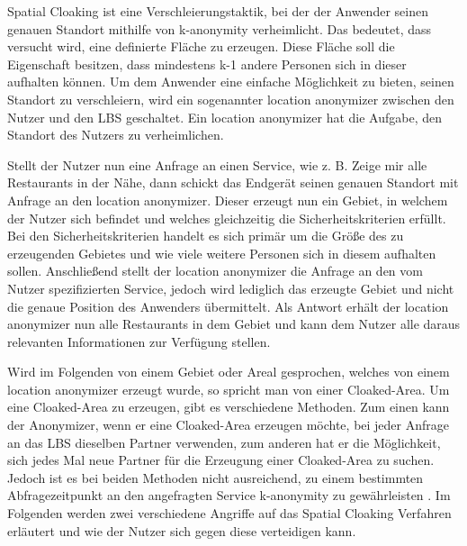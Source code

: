 Spatial Cloaking ist eine Verschleierungstaktik, bei der der Anwender seinen genauen Standort mithilfe von k-anonymity verheimlicht. Das bedeutet, dass versucht wird, eine definierte Fläche zu erzeugen. Diese Fläche soll die Eigenschaft besitzen, dass mindestens k-1 andere Personen sich in dieser aufhalten können. Um dem Anwender eine einfache Möglichkeit zu bieten, seinen Standort zu verschleiern, wird ein sogenannter location anonymizer zwischen den Nutzer und den LBS geschaltet. Ein location anonymizer hat die Aufgabe, den Standort des Nutzers zu verheimlichen.

Stellt der Nutzer nun eine Anfrage an einen Service, wie z. B. \glqq Zeige mir alle Restaurants in der Nähe\grqq, dann schickt das Endgerät seinen genauen Standort mit Anfrage an den location anonymizer. Dieser erzeugt nun ein Gebiet, in welchem der Nutzer sich befindet und welches gleichzeitig die Sicherheitskriterien erfüllt. Bei den Sicherheitskriterien handelt es sich primär um die Größe des zu erzeugenden Gebietes und wie viele weitere Personen sich in diesem aufhalten sollen. Anschließend stellt der location anonymizer die Anfrage an den vom Nutzer spezifizierten Service, jedoch wird lediglich das erzeugte Gebiet und nicht die genaue Position des Anwenders übermittelt. Als Antwort erhält der location anonymizer nun alle Restaurants in dem Gebiet und kann dem Nutzer alle daraus relevanten Informationen zur Verfügung stellen.

Wird im Folgenden von einem Gebiet oder Areal gesprochen, welches von einem location anonymizer erzeugt wurde, so spricht man von einer Cloaked-Area. Um eine Cloaked-Area zu erzeugen, gibt es verschiedene Methoden. Zum einen kann der Anonymizer, wenn er eine Cloaked-Area erzeugen möchte, bei jeder Anfrage an das LBS dieselben Partner verwenden, zum anderen hat er die Möglichkeit, sich jedes Mal neue Partner für die Erzeugung einer Cloaked-Area zu suchen. Jedoch ist es bei beiden Methoden nicht ausreichend, zu einem bestimmten Abfragezeitpunkt an den angefragten Service k-anonymity zu gewährleisten \cite{Chow2011}. Im Folgenden werden zwei verschiedene Angriffe auf das Spatial Cloaking Verfahren erläutert und wie der Nutzer sich gegen diese verteidigen kann. 
